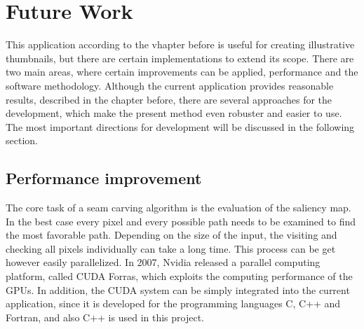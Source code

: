 \documentclass[draft,final]{vutinfth} %
\begin{document}
	\chapter{Future Work}
	This application according to the vhapter before is useful for creating illustrative thumbnails, but there are certain implementations to extend its scope. 
	There are two main areas, where certain improvements can be applied, performance and the software methodology.
	Although the current application provides reasonable results, described in the chapter before, there are several approaches for the development, which make the present method even robuster and easier to use.
	The most important directions for development will be discussed in the following section.
	
	\section{Performance improvement} 
	The core task of a seam carving algorithm is the evaluation of the saliency map.
	In the best case every pixel and every possible path needs to be examined to find the most favorable path.
	Depending on the size of the input, the visiting and checking all pixels individually can take a long time.
	This process can be get however easily parallelized.
	In 2007, Nvidia released a parallel computing platform, called CUDA Forras, which exploits the computing performance of the GPUs.
	In addition, the CUDA system can be simply integrated into the current application, since it is developed for the programming languages C, C++ and Fortran, and also C++ is used in this project.   
	
\end{document}
